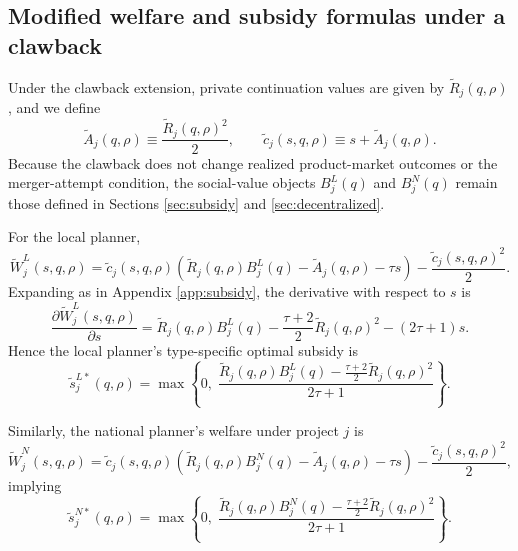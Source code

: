 \subsection{Modified welfare and subsidy formulas under a clawback}

Under the clawback extension, private continuation values are given by \(\widetilde R_j(q,\rho)\), and we define
\begin{equation}
    \widetilde A_j(q,\rho)\equiv \frac{\widetilde R_j(q,\rho)^2}{2},
    \qquad
    \widetilde c_j(s,q,\rho)\equiv s+\widetilde A_j(q,\rho).
\end{equation}
Because the clawback does not change realized product-market outcomes or the merger-attempt condition, the social-value objects \(B_j^L(q)\) and \(B_j^N(q)\) remain those defined in Sections \ref{sec:subsidy} and \ref{sec:decentralized}.

For the local planner,
\begin{equation}
    \widetilde W_j^L(s,q,\rho)
    =
    \widetilde c_j(s,q,\rho)
    \left(
        \widetilde R_j(q,\rho)B_j^L(q)
        -
        \widetilde A_j(q,\rho)
        -
        \tau s
    \right)
    -
    \frac{\widetilde c_j(s,q,\rho)^2}{2}.
\end{equation}
Expanding as in Appendix \ref{app:subsidy}, the derivative with respect to \(s\) is
\begin{equation}
    \frac{\partial \widetilde W_j^L(s,q,\rho)}{\partial s}
    =
    \widetilde R_j(q,\rho)B_j^L(q)
    -
    \frac{\tau+2}{2}\widetilde R_j(q,\rho)^2
    -
    (2\tau+1)s.
\end{equation}
Hence the local planner's type-specific optimal subsidy is
\begin{equation}
    \widetilde s_j^{L*}(q,\rho)
    =
    \max\left\{
        0,\;
        \frac{
            \widetilde R_j(q,\rho)B_j^L(q)
            -
            \frac{\tau+2}{2}\widetilde R_j(q,\rho)^2
        }{2\tau+1}
    \right\}.
\end{equation}

Similarly, the national planner's welfare under project \(j\) is
\begin{equation}
    \widetilde W_j^N(s,q,\rho)
    =
    \widetilde c_j(s,q,\rho)
    \left(
        \widetilde R_j(q,\rho)B_j^N(q)
        -
        \widetilde A_j(q,\rho)
        -
        \tau s
    \right)
    -
    \frac{\widetilde c_j(s,q,\rho)^2}{2},
\end{equation}
implying
\begin{equation}
    \widetilde s_j^{N*}(q,\rho)
    =
    \max\left\{
        0,\;
        \frac{
            \widetilde R_j(q,\rho)B_j^N(q)
            -
            \frac{\tau+2}{2}\widetilde R_j(q,\rho)^2
        }{2\tau+1}
    \right\}.
\end{equation}

